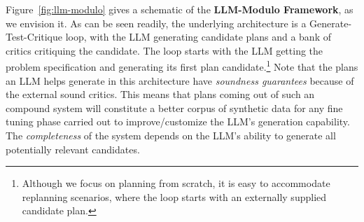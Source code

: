 \documentclass{article}
\newcommand{\rao}[1]{\noindent\textcolor{red}{#1}}
\theoremstyle{plain}
\theoremstyle{definition}
\theoremstyle{remark}
\begin{document}





Figure~\ref{fig:llm-modulo} gives a schematic of the {\bf LLM-Modulo Framework}, as we envision it. As can be seen readily, the underlying architecture is a Generate-Test-Critique loop, with the LLM generating candidate plans and a bank of critics critiquing the candidate. The loop starts with the LLM getting the problem specification and generating its first plan candidate.\footnote{Although we focus on planning from scratch, it is easy to accommodate replanning scenarios, where the loop starts with an externally supplied candidate plan.} 
Note that the plans an LLM helps generate in this architecture have {\em
  soundness guarantees}  because of the external sound critics. This
means that plans coming out of such an compound system  will constitute a
better corpus of synthetic data for any fine tuning phase carried out to
improve/customize the LLM's generation capability. The {\em
  completeness} of the system depends on the LLM's ability to generate
all potentially relevant candidates. 
\end{document}
